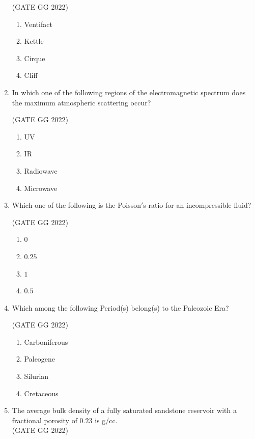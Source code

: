 \documentclass[journal]{IEEEtran}
\begin{document}
\begin{enumerate}
\hfill(GATE GG 2022)
\begin{enumerate}
\item Ventifact
\item Kettle
\item Cirque
\item Cliff
\end{enumerate}

\item In which one of the following regions of the electromagnetic spectrum does the maximum atmospheric scattering occur?

\hfill(GATE GG 2022)
\begin{enumerate}
\item UV
\item IR
\item Radiowave
\item Microwave
\end{enumerate}

\item Which one of the following is the Poisson$'$s ratio for an incompressible fluid?

\hfill(GATE GG 2022)
\begin{enumerate}
\item $0$
\item $0.25$
\item $1$
\item $0.5$
\end{enumerate}

 \item Which among the following Period(s) belong(s) to the Paleozoic Era?

\hfill(GATE GG 2022)
\begin{enumerate}
\item Carboniferous
\item Paleogene
\item Silurian
\item Cretaceous
\end{enumerate}
\vspace{0.3cm}

\item The average bulk density of a fully saturated sandstone reservoir with a fractional porosity of $0.23$ is  \makebox[2cm]{\hrulefill} g/cc.  \\
\hfill(GATE GG 2022)
\vspace{0.5cm}


\end{enumerate}
\end{document}
